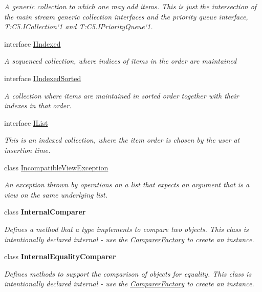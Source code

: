 \begin{DoxyCompactItemize}
\begin{DoxyCompactList}\small\item\em A generic collection to which one may add items. This is just the intersection of the main stream generic collection interfaces and the priority queue interface, T\+:\+C5.\+I\+Collection`1 and T\+:\+C5.\+I\+Priority\+Queue`1. \end{DoxyCompactList}\item 
interface \hyperlink{interface_c5_1_1_i_indexed}{I\+Indexed}
\begin{DoxyCompactList}\small\item\em A sequenced collection, where indices of items in the order are maintained \end{DoxyCompactList}\item 
interface \hyperlink{interface_c5_1_1_i_indexed_sorted}{I\+Indexed\+Sorted}
\begin{DoxyCompactList}\small\item\em A collection where items are maintained in sorted order together with their indexes in that order. \end{DoxyCompactList}\item 
interface \hyperlink{interface_c5_1_1_i_list}{I\+List}
\begin{DoxyCompactList}\small\item\em This is an indexed collection, where the item order is chosen by the user at insertion time. \end{DoxyCompactList}\item 
class \hyperlink{class_c5_1_1_incompatible_view_exception}{Incompatible\+View\+Exception}
\begin{DoxyCompactList}\small\item\em An exception thrown by operations on a list that expects an argument that is a view on the same underlying list. \end{DoxyCompactList}\item 
class {\bfseries Internal\+Comparer}
\begin{DoxyCompactList}\small\item\em Defines a method that a type implements to compare two objects. This class is intentionally declared internal -\/ use the \hyperlink{class_c5_1_1_comparer_factory}{Comparer\+Factory} to create an instance. \end{DoxyCompactList}\item 
class {\bfseries Internal\+Equality\+Comparer}
\begin{DoxyCompactList}\small\item\em Defines methods to support the comparison of objects for equality. This class is intentionally declared internal -\/ use the \hyperlink{class_c5_1_1_comparer_factory}{Comparer\+Factory} to create an instance. \end{DoxyCompactList}\item 

\end{DoxyCompactItemize}
